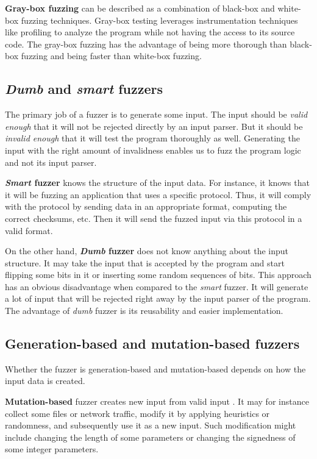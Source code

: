 \textbf{Gray-box fuzzing} can be described as a combination of black-box and white-box fuzzing techniques. Gray-box testing leverages instrumentation techniques like profiling to analyze the program while not having the access to its source code. The gray-box fuzzing has the advantage of being more thorough than black-box fuzzing and being faster than white-box fuzzing.


\subsection{\emph{Dumb} and \emph{smart} fuzzers}
\label{ssub:Dumb and smart fuzzers}
The primary job of a fuzzer is to generate some input. The input should be \emph{valid enough} that it will not be rejected directly by an input parser. But it should be \emph{invalid enough} that it will test the program thoroughly as well. Generating the input with the right amount of invalidness enables us to fuzz the program logic and not its input parser.

\textbf{\emph{Smart} fuzzer} knows the structure of the input data. For instance, it knows that it will be fuzzing an application that uses a specific protocol. Thus, it will comply with the protocol by sending data in an appropriate format, computing the correct checksums, etc. Then it will send the fuzzed input via this protocol in a valid format.

On the other hand, \textbf{\emph{Dumb} fuzzer} does not know anything about the input structure. It may take the input that is accepted by the program and start flipping some bits in it or inserting some random sequences of bits. This approach has an obvious disadvantage when compared to the \emph{smart} fuzzer. It will generate a lot of input that will be rejected right away by the input parser of the program. The advantage of \emph{dumb} fuzzer is its reusability and easier implementation.

\subsection{Generation-based and mutation-based fuzzers}
\label{ssub:Generation-based and mutation-based fuzzers}
Whether the fuzzer is generation-based and mutation-based depends on how the input data is created.

\textbf{Mutation-based} fuzzer creates new input from valid input \cite{miller2007analysis}. It may for instance collect some files or network traffic, modify it by applying heuristics or randomness, and subsequently use it as a new input. Such modification might include changing the length of some parameters or changing the signedness of some integer parameters.

